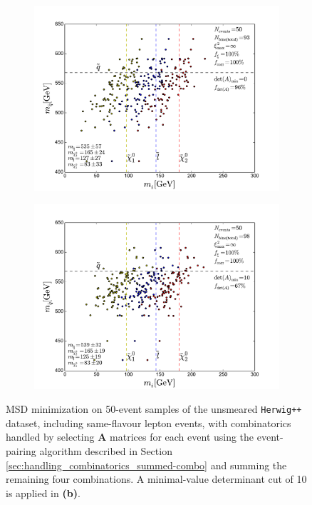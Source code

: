 \documentclass[twoside,english]{uiofysmaster}
\begin{document}
\begin{figure}[hbt]
	\centering
	\begin{subfigure}[b]{0.45\textwidth}
		\includegraphics[width=\textwidth]{figures/improving_combinatorics/herwigpp-OSFL-50events_nosmear_nodetAcut_A_matrix_algorithm_4combosum_TMP.pdf} 
		\caption{ }
		\label{fig:event-pair-A-selection_4combosum-OSFL-50events_a}
	\end{subfigure}
	\begin{subfigure}[b]{0.45\textwidth}
		\includegraphics[width=\textwidth]{figures/improving_combinatorics/herwigpp-OSFL-50events_nosmear_detAcut10_A_matrix_algorithm_4combosum_TMP.pdf}
		\caption{ }
		\label{fig:event-pair-A-selection_4combosum-OSFL-50events_b} 
	\end{subfigure}
	\caption{MSD minimization on 50-event samples of the unsmeared {\tt Herwig++} dataset, including same-flavour lepton events, with combinatorics handled by selecting $\mathbf{A}$ matrices for each event using the event-pairing algorithm described in Section \ref{sec:handling_combinatorics_summed-combo} and summing the remaining four combinations. A minimal-value determinant cut of 10 is applied in {\bf (b)}.}
	\label{fig:event-pair-A-selection_4combosum-OSFL-50events}
\end{figure}
\end{document}
